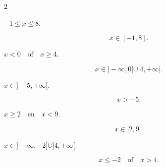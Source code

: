 \documentclass{ximera}
\begin{document}
\begin{oefening}{\oefB}
\begin{multicols}{2}
\begin{question}
$-1\leq x\leq8$.

\begin{oplossing}
\[
x\in[-1,8].
\]
\end{oplossing}
\end{question}


\begin{question}
$x<0\quad\text{of}\quad x\geq4$.

\begin{oplossing}
\[
x\in]-\infty,0[
\cup
[4,+\infty[.
\]
\end{oplossing}
\end{question}


\begin{question}
$x\in]-5,+\infty[$.

\begin{oplossing}
\[
x>-5.
\]
\end{oplossing}
\end{question}


\begin{question}
$x\geq2\quad\text{en}\quad x<9$.

\begin{oplossing}
\[
x\in[2,9[.
\]
\end{oplossing}
\end{question}


\begin{question}
$x\in]-\infty,-2]\cup]4,+\infty[$.

\begin{oplossing}
\[
x\leq-2
\quad\text{of}\quad
x>4.
\]
\end{oplossing}
\end{question}

\end{multicols}

\end{oefening}







\end{document}

